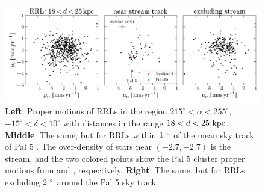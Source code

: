 \documentclass[twocolumn]{aastex63}
\begin{document}


\begin{figure}[th]
\begin{center}
\includegraphics[width=\textwidth]{paper/proper-motion.pdf}
\caption{\textbf{Left}: Proper motions of RRLs in the region $215^\circ < \alpha < 255^\circ$, $-15^\circ < \delta < 10^\circ$ with distances in the range $18 < d < 25~\mathrm{kpc}$.
\textbf{Middle}: The same, but for RRLs within $1~\mbox{$^\circ$}$ of the mean sky track of Pal 5 \citep{Bonaca:2019}.
The over-density of stars near $(-2.7, -2.7)$ is the stream, and the two colored points show the Pal 5 cluster proper motions from \citet{Vasiliev:2019} and \citet{Fritz:2015}, respectively.
\textbf{Right}: The same, but for RRLs excluding $2~\mbox{$^\circ$}$ around the Pal 5 sky track.}
\label{fig:pm}
\end{center}
\end{figure}
\end{document}
